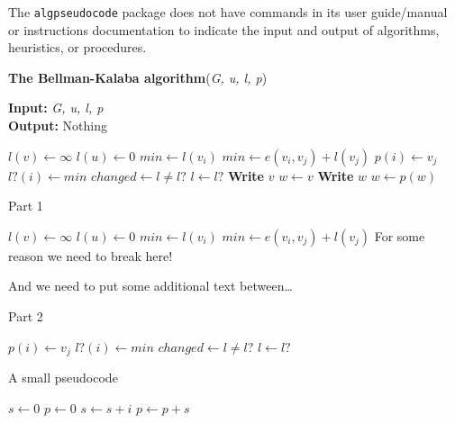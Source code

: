 \documentclass{article}
\begin{document}
The {\tt algpseudocode} package does not have commands in its user guide/manual or instructions documentation to indicate the input and output of algorithms, heuristics, or procedures.


\begin{algorithm}
\caption{{\bf The Bellman-Kalaba algorithm}({\it G, u, l, p})}
{\textbf{Input:} {\it G, u, l, p}} \\
{\textbf{Output:} Nothing}
\begin{algorithmic}[1]

		\State $l(v) \leftarrow \infty$
	\EndFor
	\State $l(u) \leftarrow 0$
	\Repeat
		\State $min \leftarrow l(v_i)$
					\State $min \leftarrow e(v_i, v_j) + l(v_j)$
					\State $p(i) \leftarrow v_j$
				\EndIf
			\EndFor
			\State $l?(i) \leftarrow min$
		\EndFor
		\State $changed \leftarrow l \not= l?$
		\State $l \leftarrow l?$
\EndProcedure
\Statex
{}
		\State \textbf{Write} $v$
	\Else
		\State $w \leftarrow v$
			\State \textbf{Write} $w$
			\State $w \leftarrow p(w)$
		\EndWhile
	\EndIf
\EndProcedure
\end{algorithmic}
\end{algorithm}


\newpage





\begin{algorithm}
\caption{Part 1}
\begin{algorithmic}[1]
		\State $l(v) \leftarrow \infty$
	\EndFor
	\State $l(u) \leftarrow 0$
	\Repeat
			\State $min \leftarrow l(v_i)$
					\State $min \leftarrow e(v_i, v_j) + l(v_j)$
					\State \Comment For some reason we need to break here!
\end{algorithmic}
\end{algorithm}

And we need to put some additional text between\dots


\begin{algorithm}[h]
\caption{Part 2}
\begin{algorithmic}[1]
						\State $p(i) \leftarrow v_j$
					\EndIf
				\EndFor
			\State $l?(i) \leftarrow min$
		\EndFor
		\State $changed \leftarrow l \not= l?$
		\State $l \leftarrow l?$
\EndProcedure
\end{algorithmic}
\end{algorithm}




\begin{algorithm}
\caption{A small pseudocode}
\begin{algorithmic}[1]
\State $s \gets 0$
\State $p \gets 0$
	\State $s \gets s + i$
	\State $p \gets p + s$
\EndFor
\end{algorithmic}
\end{algorithm}
\end{document}
